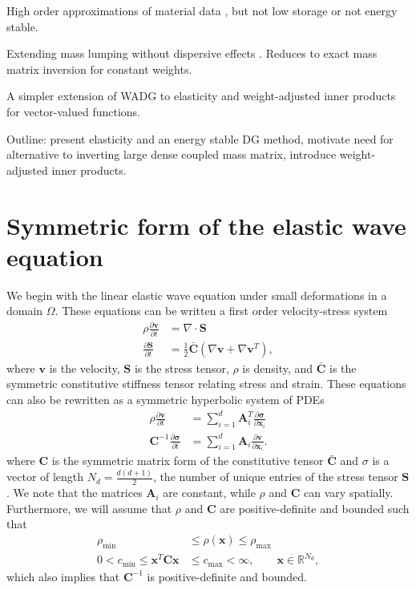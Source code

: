 \documentclass{siamart0216}
\newcommand{\pd}[2]{\frac{\partial#1}{\partial#2}}
\newcommand{\LRp}[1]{\left( #1 \right)}
\newcommand{\Grad} {\ensuremath{\nabla}}
\newcommand{\Div} {\ensuremath{\nabla\cdot}}
\begin{document}
High order approximations of material data \cite{castro2010seismic,mercerat2015nodal}, but not low storage or not energy stable.  

Extending mass lumping without dispersive effects \cite{christon1999influence,guermond2013correction}.  Reduces to exact mass matrix inversion for constant weights.  


A simpler extension of WADG \cite{chan2016weight1,chan2016weight2} to elasticity and weight-adjusted inner products for vector-valued functions.  


Outline: present elasticity and an energy stable DG method, motivate need for alternative to inverting large dense coupled mass matrix, introduce weight-adjusted inner products.  

\section{Symmetric form of the elastic wave equation }

We begin with the linear elastic wave equation under small deformations in a domain $\Omega$.  These equations can be written a first order velocity-stress  system 
\begin{align*}
\rho \pd{\bm{v}}{t} &= \Div{\bm{S}}\\
\pd{\bm{S}}{t} &= \frac{1}{2} \bar{\bm{C}}\LRp{\Grad\bm{v} + \Grad\bm{v}^T},
\end{align*}
where $\bm{v}$ is the velocity, $\bm{S}$ is the stress tensor, $\rho$ is density, and $\bar{\bm{C}}$ is the symmetric constitutive stiffness tensor relating stress and strain.  These equations can also be rewritten as a symmetric hyperbolic system of PDEs \cite{hughes1978classical}  
\begin{align}
\rho \pd{\bm{v}}{t} &= \sum_{i=1}^d \bm{A}_i^T \pd{\bm{\sigma}}{\bm{x}_i}\nonumber \\
\bm{C}^{-1} \pd{\bm{\sigma}}{t} &= \sum_{i=1}^d \bm{A}_i \pd{\bm{v}}{\bm{x}_i}.
\label{eq:symelas}
\end{align}
where $\bm{C}$ is the symmetric matrix form of the constitutive tensor $\bar{\bm{C}}$ and $\sigma$ is a vector of length $N_d = \frac{d(d+1)}{2}$, the number of unique entries of the stress tensor $\bm{S}$.  We note that the matrices $\bm{A}_i$ are constant, while $\rho$ and $\bm{C}$ can vary spatially.  Furthermore, we will assume that $\rho$ and $\bm{C}$ are positive-definite and bounded such that 
\begin{align*}
\rho_{\min} &\leq \rho(\bm{x}) \leq \rho_{\max} \\
0 < c_{\min} \leq \bm{x}^T\bm{C}\bm{x} &\leq c_{\max} < \infty, \qquad \bm{x} \in \mathbb{R}^{N_d},
\end{align*}
which also implies that $\bm{C}^{-1}$ is positive-definite and bounded.
\end{document}
